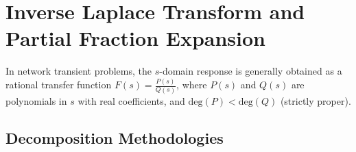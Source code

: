 \documentclass[12pt,a4paper]{article}
\begin{document}
\section{Inverse Laplace Transform and Partial Fraction Expansion}

In network transient problems, the $s$-domain response is generally obtained as a rational transfer function $F(s) = \frac{P(s)}{Q(s)}$, where $P(s)$ and $Q(s)$ are polynomials in $s$ with real coefficients, and $\text{deg}(P) < \text{deg}(Q)$ (strictly proper).

\subsection{Decomposition Methodologies}
\end{document}
